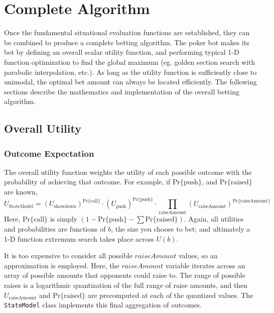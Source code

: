 
\clearpage




\chapter{Complete Algorithm}
\label{sec:CompleteAlgorithm}

Once the fundamental situational evaluation functions are established, they can be combined to produce a complete betting algorithm.
The poker bot makes its bet by defining an overall scalar utility function, and performing typical 1-D function optimization to find the global maximum (eg. golden section search with parabolic interpolation, etc.).
As long as the utility function is sufficiently close to unimodal, the optimal bet amount can always be located efficiently.
The following sections describe the mathematics and implementation of the overall betting algorithm.

\section{Overall Utility}
\label{sec:OverallUtility}


\subsection{Outcome Expectation}

The overall utility function weights the utility of each possible outcome with the probability of achieving that outcome.
For example, if $\mathrm{Pr\{push}\}$, and $\mathrm{Pr\{raised}\}$ are known, %
\[
U_\mathrm{StateModel} = \left(U_\mathrm{showdown}\right)^{\mathrm{Pr\{call\}}} \cdot \left(U_\mathrm{push}\right)^{\mathrm{Pr\{push}\}} \cdot \prod_\mathrm{raiseAmount} \left(U_\mathrm{raiseAmount}\right)^{\mathrm{Pr\{raiseAmount}\}}
\]
Here, $\mathrm{Pr\{call\}}$ is simply $\left(1 - \mathrm{Pr\{push}\} - \sum \mathrm{Pr\{raised}\}\right)$.
Again, all utilities and probabilities are functions of $b$, the size you choose to bet; and ultimately a 1-D function extremum search takes place across $U\left(b\right)$.

It is too expensive to consider all possible $raiseAmount$ values, so an approximation is employed.
Here, the $raiseAmount$ variable iterates across an array of possible amounts that opponents could raise to.
The range of possible raises is a logarithmic quantization of the full range of raise amounts, and then $U_\mathrm{raiseAmount}$ and $\mathrm{Pr\{raised}\}$ are precomputed at each of the quantized values.
The \texttt{StateModel} class implements this final aggregation of outcomes.

